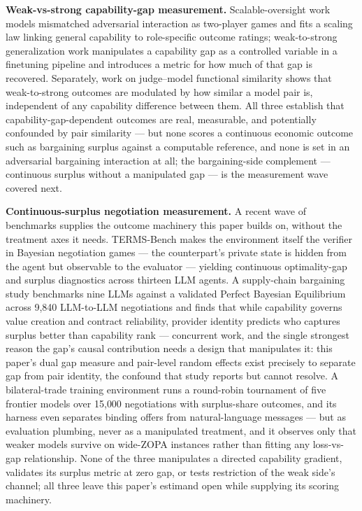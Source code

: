 \documentclass[11pt]{article}
\begin{document}
\textbf{Weak-vs-strong capability-gap measurement.} Scalable-oversight work \citep{ScalingLawsOversight} models mismatched adversarial interaction as two-player games and fits a scaling law linking general capability to role-specific outcome ratings; weak-to-strong generalization work \citep{WeakToStrong} manipulates a capability gap as a controlled variable in a finetuning pipeline and introduces a metric for how much of that gap is recovered. Separately, work on judge--model functional similarity \citep{GreatModelsThinkAlike} shows that weak-to-strong outcomes are modulated by how similar a model pair is, independent of any capability difference between them. All three establish that capability-gap-dependent outcomes are real, measurable, and potentially confounded by pair similarity --- but none scores a continuous economic outcome such as bargaining surplus against a computable reference, and none is set in an adversarial bargaining interaction at all; the bargaining-side complement --- continuous surplus without a manipulated gap --- is the measurement wave covered next.

\textbf{Continuous-surplus negotiation measurement.} A recent wave of benchmarks supplies the outcome machinery this paper builds on, without the treatment axes it needs. TERMS-Bench \citep{TermsBench2605} makes the environment itself the verifier in Bayesian negotiation games --- the counterpart's private state is hidden from the agent but observable to the evaluator --- yielding continuous optimality-gap and surplus diagnostics across thirteen LLM agents. A supply-chain bargaining study \citep{SupplyChainBargain2608} benchmarks nine LLMs against a validated Perfect Bayesian Equilibrium across 9{,}840 LLM-to-LLM negotiations and finds that while capability governs value creation and contract reliability, provider identity predicts who captures surplus better than capability rank --- concurrent work, and the single strongest reason the gap's causal contribution needs a design that manipulates it: this paper's dual gap measure and pair-level random effects exist precisely to separate gap from pair identity, the confound that study reports but cannot resolve. A bilateral-trade training environment \citep{BilateralTradeEnv2604} runs a round-robin tournament of five frontier models over 15{,}000 negotiations with surplus-share outcomes, and its harness even separates binding offers from natural-language messages --- but as evaluation plumbing, never as a manipulated treatment, and it observes only that weaker models survive on wide-ZOPA instances rather than fitting any loss-vs-gap relationship. None of the three manipulates a directed capability gradient, validates its surplus metric at zero gap, or tests restriction of the weak side's channel; all three leave this paper's estimand open while supplying its scoring machinery.
\end{document}
